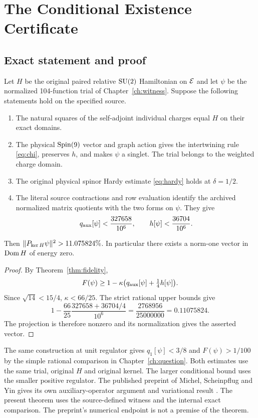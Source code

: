 \chapter{The Conditional Existence Certificate}\label{ch:certificate}

\section{Exact statement and proof}
\begin{theorem}\label{thm:exist}
Let $H$ be the original paired relative $\operatorname{SU}(2)$ Hamiltonian on $\mathcal E$ and let $\psi$ be the normalized 104-function trial of Chapter~\ref{ch:witness}. Suppose the following statements hold on the specified source.
\begin{enumerate}
 \item The natural squares of the self-adjoint individual charges equal $H$ on their exact domains.
 \item The physical $\operatorname{Spin}(9)$ vector and graph action gives the intertwining rule \eqref{eq:chi}, preserves $h$, and makes $\psi$ a singlet. The trial belongs to the weighted charge domain.
 \item The original physical spinor Hardy estimate \eqref{eq:hardy} holds at $\delta=1/2$.
 \item The literal source contractions and row evaluation identify the archived normalized matrix quotients with the two forms on $\psi$. They give
 \[
       q_{\rm aux}[\psi]<\frac{327658}{10^6},\qquad
       h[\psi]<\frac{36704}{10^6}.
 \]
\end{enumerate}
Then $\lVert P_{\ker H}\psi\rVert^2>11.075824\%$. In particular there exists a norm-one vector in $\operatorname{Dom} H$ of energy zero.
\end{theorem}

\begin{proof}
By Theorem~\ref{thm:fidelity},
\[
 F(\psi)\ge 1-\kappa\big(q_{\rm aux}[\psi]+\tfrac14 h[\psi]\big).
\]
Since $\sqrt{14}<15/4$, $\kappa<66/25$. The strict rational upper bounds give
\[
 1-\frac{66}{25}\frac{327658+36704/4}{10^6}
    =\frac{2768956}{25000000}=0.11075824 .
\]
The projection is therefore nonzero and its normalization gives the asserted vector.
\end{proof}

The same construction at unit regulator gives
$q_1[\psi]<3/8$ and $F(\psi)>1/100$ by the simple rational comparison in Chapter~\ref{ch:question}. Both estimates use the same trial, original $H$ and original kernel. The larger conditional bound uses the smaller positive regulator. The published preprint of Michel, Scheinpflug and Yin gives its own auxiliary-operator argument and variational result \cite{msy}. The present theorem uses the source-defined witness and the internal exact comparison. The preprint's numerical endpoint is not a premise of the theorem.

